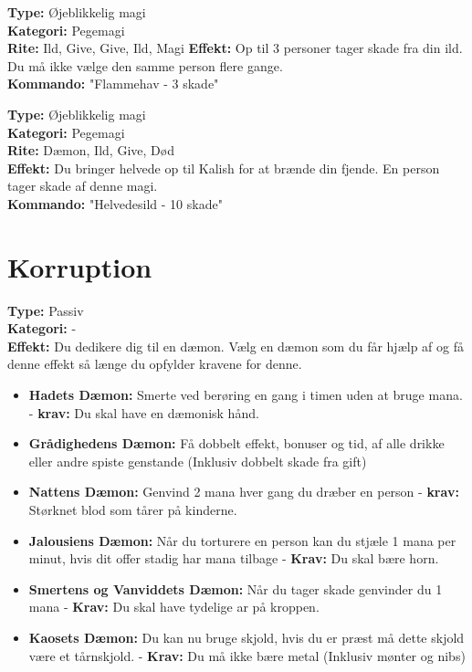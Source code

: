 \begin{dHævn*}[Flammehav]
\textbf{Type:} Øjeblikkelig magi\\
\textbf{Kategori:} Pegemagi\\
\textbf{Rite:} Ild, Give, Give, Ild, Magi
\textbf{Effekt:} Op til 3 personer tager skade fra din ild. Du må ikke vælge den samme person flere gange.\\
\textbf{Kommando:} "Flammehav - 3 skade"
\end{dHævn*}

\begin{dHævn*}
\textbf{Type:} Øjeblikkelig magi\\
\textbf{Kategori:} Pegemagi\\
\textbf{Rite:} Dæmon, Ild, Give, Død\\
\textbf{Effekt:} Du bringer helvede op til Kalish for at brænde din fjende. En person tager skade af denne magi.\\
\textbf{Kommando:} "Helvedesild - 10 skade"
\end{dHævn*}

\section*{Korruption}
\begin{korruption*}
\textbf{Type:} Passiv\\
\textbf{Kategori:} -\\
\textbf{Effekt:} Du dedikere dig til en dæmon. Vælg en dæmon som du får hjælp af og få denne effekt så længe du opfylder kravene for denne.
\begin{itemize}
    \item \textbf{Hadets Dæmon:} Smerte ved berøring en gang i timen uden at bruge mana. - \textbf{krav:} Du skal have en dæmonisk hånd.
    \item \textbf{Grådighedens Dæmon:} Få dobbelt effekt, bonuser og tid, af alle drikke eller andre spiste genstande (Inklusiv dobbelt skade fra gift)
    \item \textbf{Nattens Dæmon:} Genvind 2 mana hver gang du dræber en person - \textbf{krav:} Størknet blod som tårer på kinderne.
    \item \textbf{Jalousiens Dæmon:} Når du torturere en person kan du stjæle 1 mana per minut, hvis dit offer stadig har mana tilbage - \textbf{Krav:} Du skal bære horn.
    \item \textbf{Smertens og Vanviddets Dæmon:} Når du tager skade genvinder du 1 mana - \textbf{Krav:} Du skal have tydelige ar på kroppen.
    \item \textbf{Kaosets Dæmon:} Du kan nu bruge skjold, hvis du er præst må dette skjold være et tårnskjold. - \textbf{Krav:} Du må ikke bære metal (Inklusiv mønter og nibs)
\end{itemize}
\end{korruption*}


